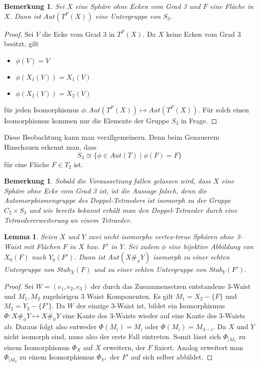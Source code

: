 \documentclass[12pt,titlepage,twoside,cleardoublepage]{article}
\theoremstyle{nummermitklammern}
\newtheorem{lemma}[temp]{Lemma}
\newtheorem{bemerkung}[temp]{Bemerkung}
\newtheorem{lemma}[zahl]{Lemma}
\newtheorem{bemerkung}[zahl]{Bemerkung}
\numberwithin{equation}{section}
\begin{document}
\begin{bemerkung}
Sei $X$ eine Sphäre ohne Ecken vom Grad 3 und $F$ eine Fläche in $X$. Dann ist $Aut(T^F(X))$ eine Untergruppe von $S_3.$ 
\end{bemerkung}
\begin{proof}
Sei $V$ die Ecke vom Grad 3 in $T^F(X).$
Da $X$ keine Ecken vom Grad 3 besitzt, gilt
\begin{itemize}
\item $\phi(V)=V$
\item $\phi (X_1(V))=X_1(V)$
\item $\phi (X_2(V))=X_2(V)$
\end{itemize}
für jeden Isomorphismus $\phi:Aut({T}^F(X))\mapsto Aut({T}^F(X)).$ Für solch einen Isomorphismus kommen nur die Elemente der Gruppe $S_3$ in Frage. 
\end{proof}
Diese Beobachtung kann man verallgemeinern. Denn beim Genauerem Hinschauen erkennt man, dass 
\[
S_3\cong\{\phi\in Aut(T)\mid \phi(F)=F\}
\] für eine Fläche $F\in T_2$ ist.
\begin{bemerkung}
Sobald die Voraussetzung fallen gelassen wird, dass $X$ eine Sphäre ohne Ecke vom Grad 3 ist, ist die Aussage falsch, denn die Automorphismengruppe des Doppel-Tetraeders ist isomorph zu der Gruppe $C_2\times S_3$ und wie bereits bekannt erhält man den Doppel-Tetraeder durch eine Tetraedererweiterung an einem Tetraeder.
\end{bemerkung}
\begin{lemma}
Seien $X$ und $Y$ zwei nicht isomorphe vertex-treue Sphären ohne 3-Waist mit Flächen $F$ in $X$ bzw. $F'$ in $Y$. Sei zudem $\phi$ eine bijektive Abbildung von $X_0(F)$ nach $Y_0(F').$ Dann ist $Aut(X\#_\phi Y)$ isomorph zu einer echten Untergruppe von $Stab_X(F)$ und zu einer echten Untergruppe von $Stab_Y(F').$
\end{lemma}
\begin{proof}
Sei $W=(e_1,e_2,e_3)$ der durch das Zusammensetzen entstandene 3-Waist und $M_1,M_2$ zugehörigen 3 Waist Komponenten. Es gilt $M_1=X_2-\{F\}$ und $M_2=Y_2-\{F'\}.$ Da $W$ der einzige 3-Waist ist, bildet ein Isomorphismus $\Phi:X\#_{\phi}Y \mapsto X\#_{\phi}Y$  eine Kante des 3-Waists wieder auf eine Kante des 3-Waists ab. Daraus folgt also entweder $\Phi(M_i)=M_i$ oder $\Phi(M_i)=M_{3-i}.$ Da $X$ und $Y$ nicht isomorph sind, muss also der erste Fall eintreten. Somit lässt sich \textsc{$\Phi_{\mid M_1}$} zu einem Isomorphismus $\Phi_X$ auf $X$ erweitern, der $F$ fixiert. Analog erweitert man $\Phi_{\mid M_2}$ zu einem Isomorphismus $\Phi_Y,$ der $F'$ auf sich selber abbildet.
\end{proof}
\end{document}
